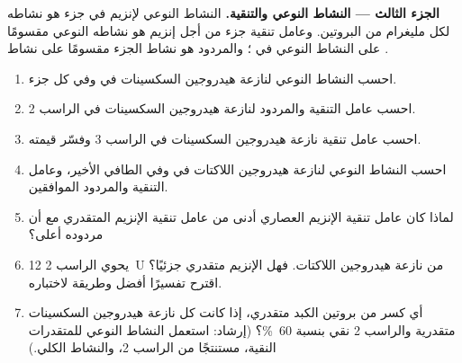 \begin{problem}
\medskip
\noindent\textbf{الجزء الثالث --- النشاط النوعي والتنقية.}
النشاط النوعي لإنزيم في جزء هو نشاطه لكل مليغرام من البروتين. وعامل
تنقية جزء من أجل إنزيم هو نشاطه النوعي مقسومًا على النشاط النوعي في
؛ والمردود هو نشاط الجزء مقسومًا على نشاط .
\begin{enumerate}[resume]
  \item احسب النشاط النوعي لنازعة هيدروجين السكسينات في  وفي
        كل جزء.
  \item احسب عامل التنقية والمردود لنازعة هيدروجين السكسينات في
        الراسب 2.
  \item احسب عامل تنقية نازعة هيدروجين السكسينات في الراسب 3 وفسّر
        قيمته.
  \item احسب النشاط النوعي لنازعة هيدروجين اللاكتات في  وفي
        الطافي الأخير، وعامل التنقية والمردود الموافقين.
  \item لماذا كان عامل تنقية الإنزيم العصاري أدنى من عامل تنقية
        الإنزيم المتقدري مع أن مردوده أعلى؟
  \item يحوي الراسب 2 \qty{12}{U} من نازعة هيدروجين اللاكتات. فهل
        الإنزيم متقدري جزئيًا؟ اقترح تفسيرًا أفضل وطريقة لاختباره.
  \item أي كسر من بروتين الكبد متقدري، إذا كانت كل نازعة هيدروجين
        السكسينات متقدرية والراسب 2 نقي بنسبة \qty{60}{\%}؟ (إرشاد:
        استعمل النشاط النوعي للمتقدرات النقية، مستنتجًا من الراسب 2،
        والنشاط الكلي.)
\end{enumerate}


\end{problem}
